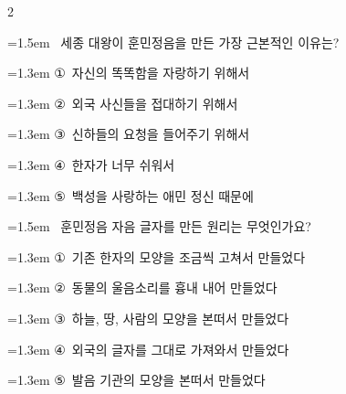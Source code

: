 \documentclass[11pt, a4paper]{article}
\begin{document}
\begin{multicols}{2}
\noindent\begin{minipage}{\columnwidth}
\vspace{2mm}
{\hangindent=1.5em  ~세종 대왕이 훈민정음을 만든 가장 근본적인 이유는?\par}

\vspace{0.5mm}
{\hangindent=1.3em  \noindent\hspace{0.3em}①~자신의 똑똑함을 자랑하기 위해서\par}
{\hangindent=1.3em  \noindent\hspace{0.3em}②~외국 사신들을 접대하기 위해서\par}
{\hangindent=1.3em  \noindent\hspace{0.3em}③~신하들의 요청을 들어주기 위해서\par}
{\hangindent=1.3em  \noindent\hspace{0.3em}④~한자가 너무 쉬워서\par}
{\hangindent=1.3em  \noindent\hspace{0.3em}⑤~백성을 사랑하는 애민 정신 때문에\par}
\vspace{4mm}
\end{minipage}
\par

\noindent\begin{minipage}{\columnwidth}
\vspace{2mm}
{\hangindent=1.5em  ~훈민정음 자음 글자를 만든 원리는 무엇인가요?\par}

\vspace{0.5mm}
{\hangindent=1.3em  \noindent\hspace{0.3em}①~기존 한자의 모양을 조금씩 고쳐서 만들었다\par}
{\hangindent=1.3em  \noindent\hspace{0.3em}②~동물의 울음소리를 흉내 내어 만들었다\par}
{\hangindent=1.3em  \noindent\hspace{0.3em}③~하늘, 땅, 사람의 모양을 본떠서 만들었다\par}
{\hangindent=1.3em  \noindent\hspace{0.3em}④~외국의 글자를 그대로 가져와서 만들었다\par}
{\hangindent=1.3em  \noindent\hspace{0.3em}⑤~발음 기관의 모양을 본떠서 만들었다\par}
\vspace{4mm}
\end{minipage}
\par


\end{multicols}
\end{document}
